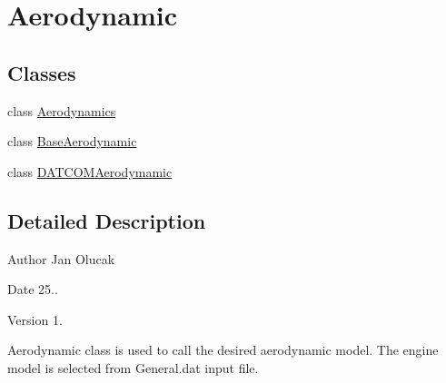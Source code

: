 \hypertarget{group___aerodynamic}{}\section{Aerodynamic}
\label{group___aerodynamic}
\subsection*{Classes}
\begin{DoxyCompactItemize}
\item 
class \hyperlink{class_aerodynamics}{Aerodynamics}
\item 
class \hyperlink{class_base_aerodynamic}{Base\+Aerodynamic}
\item 
class \hyperlink{class_d_a_t_c_o_m_aerodymamic}{D\+A\+T\+C\+O\+M\+Aerodymamic}
\end{DoxyCompactItemize}


\subsection{Detailed Description}
\begin{DoxyAuthor}{Author}
Jan Olucak 
\end{DoxyAuthor}
\begin{DoxyDate}{Date}
25.. 
\end{DoxyDate}
\begin{DoxyVersion}{Version}
1.
\end{DoxyVersion}
Aerodynamic class is used to call the desired aerodynamic model. The engine model is selected from General.\+dat input file. 